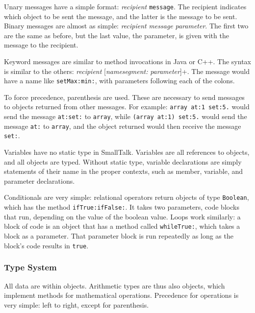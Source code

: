 	Unary messages have a simple format: \emph{recipient} \texttt{message}.  The recipient indicates which object to be sent the message, and the latter is the message to be sent.  Binary messages are almost as simple: \emph{recipient} \emph{message} \emph{parameter}.  The first two are the same as before, but the last value, the parameter, is given with the message to the recipient.

	Keyword messages are similar to method invocations in Java or C++.  The syntax is similar to the others: \emph{recipient} [\emph{namesegment:} \emph{parameter}]+.  The message would have a name like \texttt{setMax:min:}, with parameters following each of the colons.

	To force precedence, parenthesis are used.  These are necessary to send messages to objects returned from other messages.  For example: \texttt{array at:1 set:5.} would send the message \texttt{at:set:} to \texttt{array}, while \texttt{(array at:1) set:5.} would send the message \texttt{at:} to \texttt{array}, and the object returned would then receive the message \texttt{set:}.

	Variables have no static type in SmallTalk.  Variables are all references to objects, and all objects are typed.  Without static type, variable declarations are simply statements of their name in the proper contexts, such as member, variable, and parameter declarations.

	Conditionals are very simple: relational operators return objects of type \texttt{Boolean}, which has the method \texttt{ifTrue:ifFalse:}.  It takes two parameters, code blocks that run, depending on the value of the boolean value.  Loops work similarly: a block of code is an object that has a method called \texttt{whileTrue:}, which takes a block as a parameter.  That parameter block is run repeatedly as long as the block's code results in \texttt{true}.

	

\subsubsection{Type System}
	All data are within objects.  Arithmetic types are thus also objects, which implement methods for mathematical operations.  Precedence for operations is very simple: left to right, except for parenthesis. 

